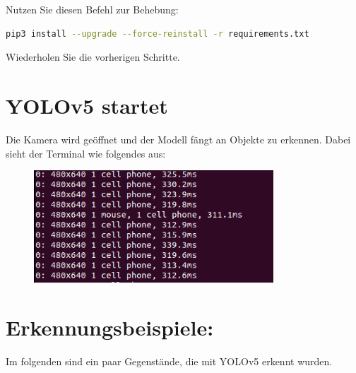 \documentclass{article}
\begin{document}
Nutzen Sie diesen Befehl zur Behebung:
\begin{lstlisting}[language=bash]
pip3 install --upgrade --force-reinstall -r requirements.txt
\end{lstlisting}
Wiederholen Sie die vorherigen Schritte.



\clearpage
\section{YOLOv5 startet}
Die Kamera wird geöffnet und der Modell fängt an Objekte zu erkennen.
Dabei sieht der Terminal wie folgendes aus: 
\begin{figure}[h!]
    \centering
    \includegraphics[width=0.8\textwidth]{Bilder/terminalErgebnisse.png}
\end{figure}

\section{Erkennungsbeispiele:}
Im folgenden sind ein paar Gegenstände, die mit YOLOv5 erkennt wurden.
\end{document}
